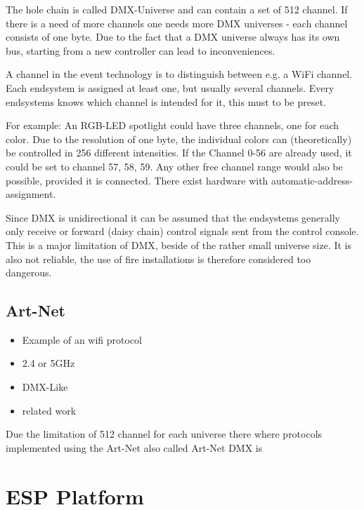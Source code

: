 The hole chain is called DMX-Universe and can contain a set of 512 channel.
If there is a need of more channels one needs more DMX universes - each channel consists of one byte.
Due to the fact that a DMX universe always has its own bus, starting from a new controller can lead to inconveniences.

A channel in the event technology is to distinguish between e.g. a WiFi channel.
Each endsystem is assigned at least one, but usually several channels.
Every endsystems knows which channel is intended for it, this must to be preset.

For example: An RGB-LED spotlight could have three channels, one for each color.
Due to the resolution of one byte, the individual colors can (theoretically) be controlled in 256 different intensities.
If the Channel 0-56 are already used, it could be set to channel 57, 58, 59.
Any other free channel range would also be possible, provided it is connected.
There exist hardware with automatic-address-assignment.


Since \ac{DMX} is unidirectional it can be assumed that the endsystems generally only receive or forward (daisy chain) control signals sent from the control console.
This is a major limitation of DMX, beside of the rather small universe size.
It is also not reliable, the use of fire installations is therefore considered too dangerous.

\subsection{Art-Net}
\label{sec:artnet}
\begin{itemize}
	\item Example of an wifi protocol
	\item 2.4 or 5GHz
	\item DMX-Like
	\item related work
\end{itemize}

Due the limitation of 512 channel for each universe there where protocols implemented using the 
Art-Net also called Art-Net DMX is 

\section{ESP Platform}

